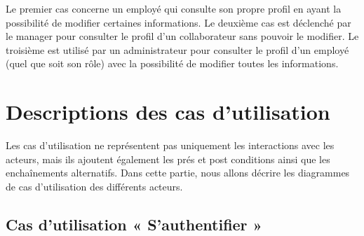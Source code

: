 Le premier cas concerne un employé qui consulte son propre profil en ayant la
possibilité de modifier certaines informations. Le deuxième cas est déclenché
par le manager pour consulter le profil d’un collaborateur sans pouvoir le
modifier. Le troisième est utilisé par un administrateur pour consulter le
profil d’un employé (quel que soit son rôle) avec la possibilité de modifier
toutes les informations. 

\section{Descriptions des cas d'utilisation}
Les cas d’utilisation ne représentent pas uniquement les interactions avec les
acteurs, mais ils ajoutent également les prés et post conditions ainsi que les
enchaînements alternatifs. Dans cette partie, nous allons décrire les diagrammes
de cas d’utilisation des différents acteurs.
    
\subsection*{Cas d'utilisation « S'authentifier »}

